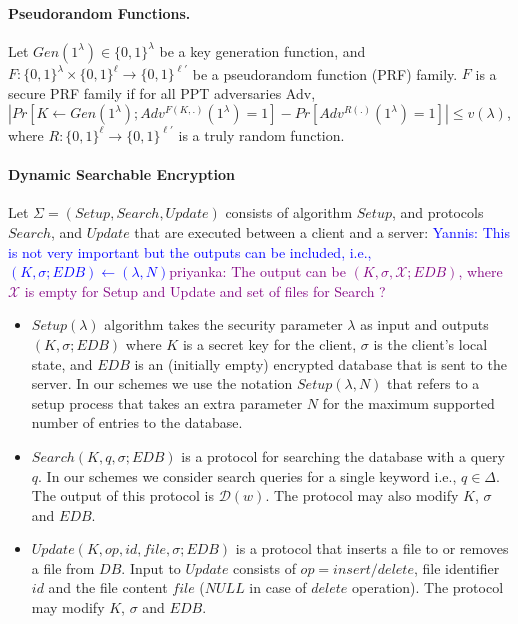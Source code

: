 \documentclass[sigconf]{acmart}
\newcommand{\yannis}[1]{\textcolor{blue}{Yannis: #1}}
\newcommand{\priyanka}[1]{\textcolor{purple}{priyanka: #1}}
\newcommand{\DB}[1]{\mathcal{D}(#1)}
\begin{document}
\paragraph{\textbf{Pseudorandom Functions.}}
Let $Gen(1^{\lambda}) \in \{0, 1\}^{\lambda}$ be a
key generation function, 
and $F : {\{0, 1\}}^{\lambda} \times {\{0, 1\}}^{\ell} \rightarrow
{\{0, 1\}}^{\ell'}$ be a pseudorandom function (PRF) family. 
$F$ is a secure PRF family if for all PPT adversaries Adv,
$|Pr[K \leftarrow Gen(1^{\lambda}); 
Adv^{F(K,.)}(1^{\lambda}) = 1]-Pr[Adv^{R(.)}(1^{\lambda}) = 1]| \leq v(\lambda)$, 
where $R : {\{0, 1\}}^{\ell} \rightarrow {\{0, 1\}}^{\ell'}$ is a truly random function.


\paragraph{\textbf{Dynamic Searchable Encryption}}
Let  $\Sigma = (Setup, Search, Update)$
consists of algorithm $Setup$, and protocols $Search$, and $Update$
that are executed between a client and a server: \yannis{This is not very important but the outputs can be included, i.e., $(K, \sigma; EDB) \leftarrow (
\lambda, N)$}\priyanka{The output can be $(K, \sigma,  \mathcal{X}; EDB)$, where $\mathcal{X}$ is empty for Setup and Update and set of files for Search ?}
\begin{itemize}
    \item $Setup(\lambda)$ algorithm takes the security parameter $\lambda$ as input and outputs $(K, \sigma; EDB)$ where $K$ is
    a secret key for the client, $\sigma$ is the client’s local state, and $EDB$ is an (initially empty) encrypted database
    that is sent to the server. In our schemes we use the notation $Setup(\lambda, N)$ that refers to a setup process that takes an extra parameter $N$ for the maximum supported number of entries to the database.
    \item $Search(K, q, \sigma; EDB)$ is a protocol for searching the database with a query $q$. In our schemes we consider search queries for a single keyword i.e., $q \in \Delta$. The output of this protocol is $\DB{w}$. The protocol may also modify $K$, $\sigma$ and $EDB$.
    \item $Update(K, op, id, file, \sigma ; EDB)$ is a protocol that inserts a file to or removes a file from $DB$. Input to $Update$ consists of $op =insert/delete$, file identifier $id$ and the file content $file$ ($NULL$ in case of $delete$ operation). The protocol may modify $K$, $\sigma$ and $EDB$.
\end{itemize}
\end{document}
